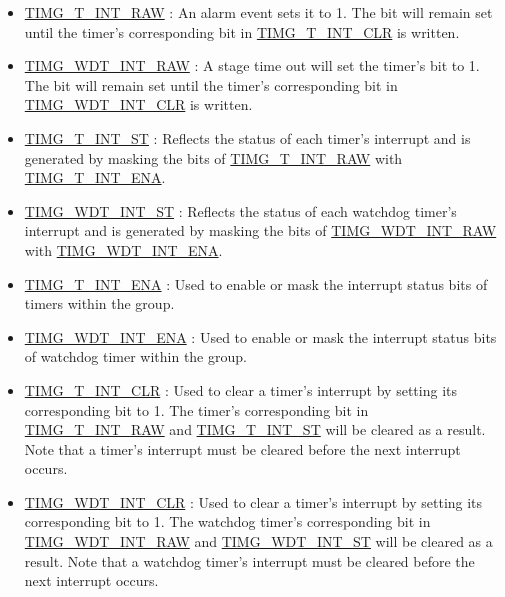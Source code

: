 \documentclass[main\_\_EN.tex]{subfiles}
\begin{document}
\begin{itemize}

\item \hyperref[fielddesc:TIMGTXINTRAW]{TIMG\_T\_INT\_RAW} :
An alarm event sets it to 1. The bit will remain set until the timer's corresponding bit in \hyperref[fielddesc:TIMGTXINTCLR]{TIMG\_T\_INT\_CLR} is written.
\item \hyperref[fielddesc:TIMGWDTINTRAW]{TIMG\_WDT\_INT\_RAW} : A stage time out will set the timer's bit to 1. The bit will remain set until the timer's corresponding bit in \hyperref[fielddesc:TIMGWDTINTCLR]{TIMG\_WDT\_INT\_CLR} is written.
\item \hyperref[fielddesc:TIMGTXINTST]{TIMG\_T\_INT\_ST} : Reflects the status of each timer's interrupt and is generated by masking the bits of \hyperref[fielddesc:TIMGTXINTRAW]{TIMG\_T\_INT\_RAW} with \hyperref[fielddesc:TIMGTXINTENA]{TIMG\_T\_INT\_ENA}.
\item \hyperref[fielddesc:TIMGWDTINTST]{TIMG\_WDT\_INT\_ST} : Reflects the status of each watchdog timer's interrupt and is generated by masking the bits of \hyperref[fielddesc:TIMGWDTINTRAW]{TIMG\_WDT\_INT\_RAW} with \hyperref[fielddesc:TIMGWDTINTENA]{TIMG\_WDT\_INT\_ENA}.
\item \hyperref[fielddesc:TIMGTXINTENA]{TIMG\_T\_INT\_ENA} : Used to enable or mask the interrupt status bits of timers within the group.
\item \hyperref[fielddesc:TIMGWDTINTENA]{TIMG\_WDT\_INT\_ENA} : Used to enable or mask the interrupt status bits of watchdog timer within the group.
\item \hyperref[fielddesc:TIMGTXINTCLR]{TIMG\_T\_INT\_CLR} : Used to clear a timer's interrupt by setting its corresponding bit to 1. The timer's corresponding bit in \hyperref[fielddesc:TIMGTXINTRAW]{TIMG\_T\_INT\_RAW} and \hyperref[fielddesc:TIMGTXINTST]{TIMG\_T\_INT\_ST} will be cleared as a result. Note that a timer's interrupt must be cleared before the next interrupt occurs.
\item \hyperref[fielddesc:TIMGWDTINTCLR]{TIMG\_WDT\_INT\_CLR} : Used to clear a timer's interrupt by setting its corresponding bit to 1. The watchdog timer's corresponding bit in \hyperref[fielddesc:TIMGWDTINTRAW]{TIMG\_WDT\_INT\_RAW} and \hyperref[fielddesc:TIMGWDTINTST]{TIMG\_WDT\_INT\_ST} will be cleared as a result. Note that a watchdog timer's interrupt must be cleared before the next interrupt occurs.
\end{itemize}
\end{document}
